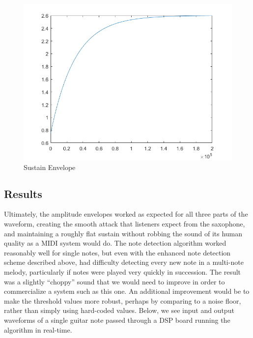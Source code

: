 \documentclass[12pt]{article}
\begin{document}
\begin{figure}[H]
\includegraphics[scale=0.55]{Pictures/Sustain_Env.png}
\centering
\caption{Sustain Envelope}
\centering
\end{figure}

\subsection {Results}
Ultimately, the amplitude envelopes worked as expected for all three parts of the waveform,  creating the smooth attack that listeners expect from the saxophone, and maintaining a roughly flat sustain without robbing the sound of its human quality as a MIDI system would do. The note detection algorithm worked reasonably well for single notes, but even with the enhanced note detection scheme described above, had difficulty detecting every new note in a multi-note melody, particularly if notes were played very quickly in succession. The result was a slightly ``choppy'' sound that we would need to improve in order to commercialize a system such as this one. An additional improvement would be to make the threshold values more robust, perhaps by comparing to a noise floor, rather than simply using hard-coded values. Below, we see input and output waveforms of a single guitar note passed through a DSP board running the algorithm in real-time.
\end{document}
